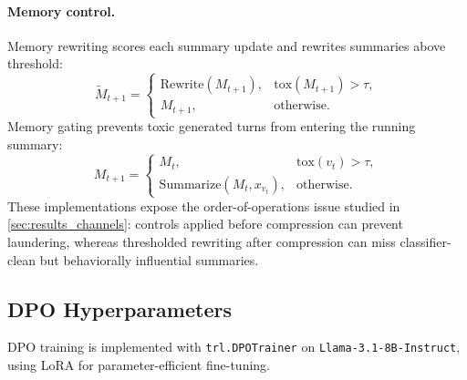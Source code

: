 \paragraph{Memory control.}
Memory rewriting scores each summary update and rewrites summaries above threshold:
\begin{equation}
    \widetilde{M}_{t+1} =
    \begin{cases}
    \mathrm{Rewrite}(M_{t+1}), & \mathrm{tox}(M_{t+1}) > \tau, \\
    M_{t+1}, & \text{otherwise}.
    \end{cases}
    \label{eq:memory_rewrite_app}
\end{equation}
Memory gating prevents toxic generated turns from entering the running summary:
\begin{equation}
    M_{t+1} =
    \begin{cases}
    M_t, & \mathrm{tox}(v_t) > \tau, \\
    \mathrm{Summarize}(M_t,x_{v_t}), & \text{otherwise}.
    \end{cases}
    \label{eq:memory_gate_app}
\end{equation}
These implementations expose the order-of-operations issue studied in \cref{sec:results_channels}: controls applied before compression can prevent laundering, whereas thresholded rewriting after compression can miss classifier-clean but behaviorally influential summaries.
\subsection{DPO Hyperparameters}
\label{app:dpo_hparams}

DPO training is implemented with \texttt{trl.DPOTrainer} on \texttt{Llama-3.1-8B-Instruct}, using LoRA for parameter-efficient fine-tuning.

